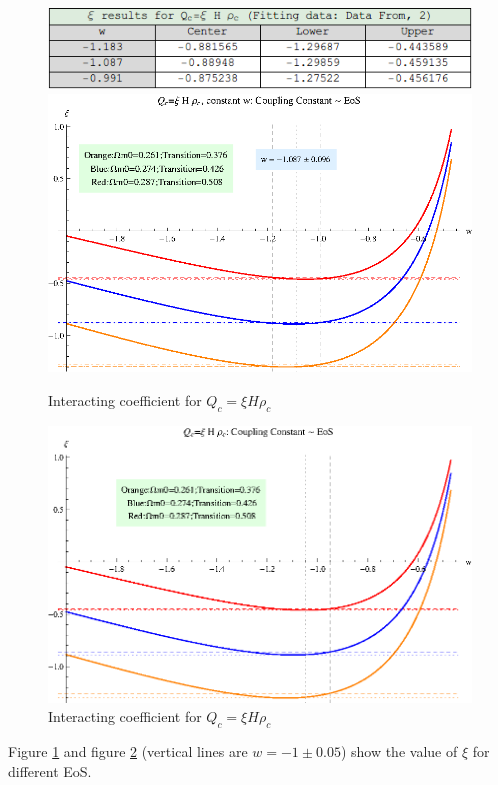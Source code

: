 \documentclass[12pt,a4paper]{article}
\begin{document}
\begin{figure}[htpb]
\centering
\includegraphics[width=500pt]{rhoc_ICC_table3.png}
\includegraphics[width=500pt]{rhoc_ICC_xiVSw.eps}
\caption{Interacting coefficient for $Q_c=\xi H\rho_c$}\label{fig-rhoc_ICC_xiVSw}
\end{figure}

\begin{figure}[htpb]
\centering
\includegraphics[width=500pt]{rhoc_ICC_xiVSw2.eps}
\caption{Interacting coefficient for $Q_c=\xi H\rho_c$}\label{fig-rhoc_ICC_xiVSw2}
\end{figure}


Figure \ref{fig-rhoc_ICC_xiVSw} and figure \ref{fig-rhoc_ICC_xiVSw2} (vertical lines are $w=-1\pm 0.05$) show the value of $\xi$ for different EoS. 
\end{document}
